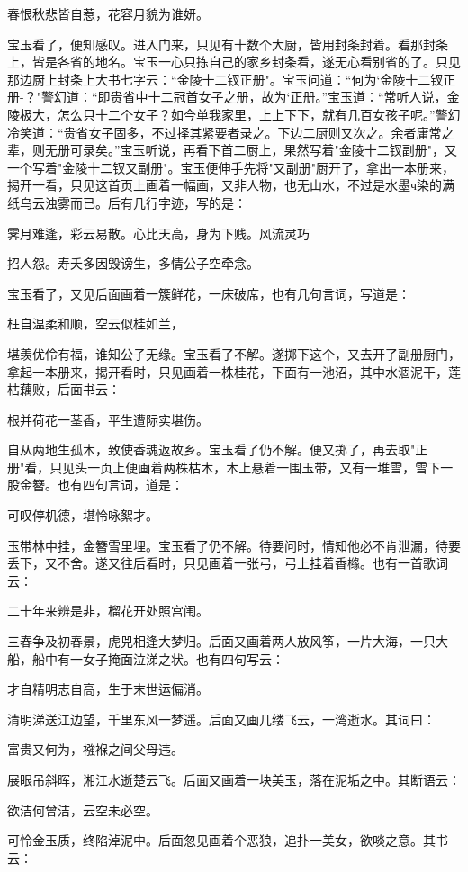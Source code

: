 春恨秋悲皆自惹，花容月貌为谁妍。

宝玉看了，便知感叹。进入门来，只见有十数个大厨，皆用封条封着。看那封条上，皆是各省的地名。宝玉一心只拣自己的家乡封条看，遂无心看别省的了。只见那边厨上封条上大书七字云：“金陵十二钗正册"。宝玉问道：“何为`金陵十二钗正册-？"警幻道：“即贵省中十二冠首女子之册，故为`正册。”宝玉道：“常听人说，金陵极大，怎么只十二个女子？如今单我家里，上上下下，就有几百女孩子呢。”警幻冷笑道：“贵省女子固多，不过择其紧要者录之。下边二厨则又次之。余者庸常之辈，则无册可录矣。”宝玉听说，再看下首二厨上，果然写着"金陵十二钗副册"，又一个写着"金陵十二钗又副册"。宝玉便伸手先将"又副册"厨开了，拿出一本册来，揭开一看，只见这首页上画着一幅画，又非人物，也无山水，不过是水墨ч染的满纸乌云浊雾而已。后有几行字迹，写的是：

霁月难逢，彩云易散。心比天高，身为下贱。风流灵巧

招人怨。寿夭多因毁谤生，多情公子空牵念。

宝玉看了，又见后面画着一簇鲜花，一床破席，也有几句言词，写道是：

枉自温柔和顺，空云似桂如兰，

堪羡优伶有福，谁知公子无缘。宝玉看了不解。遂掷下这个，又去开了副册厨门，拿起一本册来，揭开看时，只见画着一株桂花，下面有一池沼，其中水涸泥干，莲枯藕败，后面书云：

根并荷花一茎香，平生遭际实堪伤。

自从两地生孤木，致使香魂返故乡。宝玉看了仍不解。便又掷了，再去取"正册"看，只见头一页上便画着两株枯木，木上悬着一围玉带，又有一堆雪，雪下一股金簪。也有四句言词，道是：

可叹停机德，堪怜咏絮才。

玉带林中挂，金簪雪里埋。宝玉看了仍不解。待要问时，情知他必不肯泄漏，待要丢下，又不舍。遂又往后看时，只见画着一张弓，弓上挂着香橼。也有一首歌词云：

二十年来辨是非，榴花开处照宫闱。

三春争及初春景，虎兕相逢大梦归。后面又画着两人放风筝，一片大海，一只大船，船中有一女子掩面泣涕之状。也有四句写云：

才自精明志自高，生于末世运偏消。

清明涕送江边望，千里东风一梦遥。后面又画几缕飞云，一湾逝水。其词曰：

富贵又何为，襁褓之间父母违。

展眼吊斜晖，湘江水逝楚云飞。后面又画着一块美玉，落在泥垢之中。其断语云：

欲洁何曾洁，云空未必空。

可怜金玉质，终陷淖泥中。后面忽见画着个恶狼，追扑一美女，欲啖之意。其书云：

